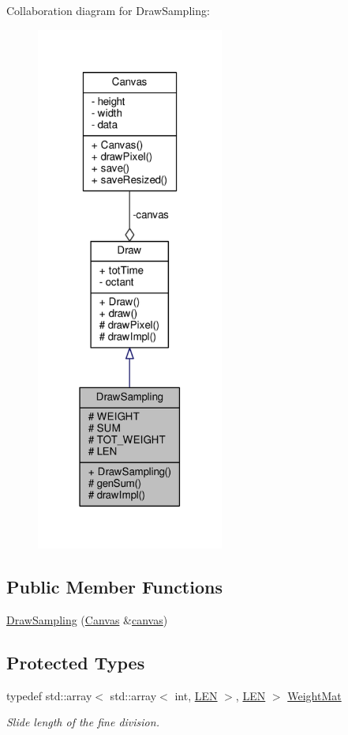 Collaboration diagram for Draw\+Sampling\+:\nopagebreak
\begin{figure}[H]
\begin{center}
\leavevmode
\includegraphics[width=175pt]{classDrawSampling__coll__graph}
\end{center}
\end{figure}
\subsection*{Public Member Functions}
\begin{DoxyCompactItemize}
\item 
\hyperlink{classDrawSampling_aa02ae6778de2385b7451f62f1e03cb1e}{Draw\+Sampling} (\hyperlink{classCanvas}{Canvas} \&\hyperlink{classDraw_a72ed77716d9eb7068414f0e4e00753bd}{canvas})
\end{DoxyCompactItemize}
\subsection*{Protected Types}
\begin{DoxyCompactItemize}
\item 
typedef std\+::array$<$ std\+::array$<$ int, \hyperlink{classDrawSampling_a65a0b2e1d234d93049c4807d32fd009d}{L\+EN} $>$, \hyperlink{classDrawSampling_a65a0b2e1d234d93049c4807d32fd009d}{L\+EN} $>$ \hyperlink{classDrawSampling_a73c5d308c9d35c89746810be84e6834d}{Weight\+Mat}
\begin{DoxyCompactList}\small\item\em Slide length of the fine division. \end{DoxyCompactList}\end{DoxyCompactItemize}
